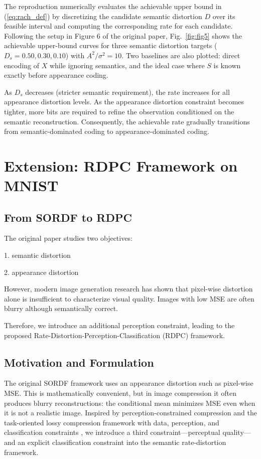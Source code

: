 \documentclass[conference]{IEEEtran}
\begin{document}
The reproduction numerically evaluates the achievable upper bound in (\ref{eq:rach_def}) by discretizing the candidate semantic distortion $D$ over its feasible interval and computing the corresponding rate for each candidate. Following the setup in Figure 6 of the original paper, Fig.~\ref{fig:fig5} shows the achievable upper-bound curves for three semantic distortion targets ($D_s = 0.50, 0.30, 0.10$) with $A^2/\sigma^2 = 10$. Two baselines are also plotted: direct encoding of $X$ while ignoring semantics, and the ideal case where $S$ is known exactly before appearance coding.

As $D_s$ decreases (stricter semantic requirement), the rate increases for all appearance distortion levels. As the appearance distortion constraint becomes tighter, more bits are required to refine the observation conditioned on the semantic reconstruction. Consequently, the achievable rate gradually transitions from semantic-dominated coding to appearance-dominated coding.

\section{Extension: RDPC Framework on MNIST}

\subsection{From SORDF to RDPC}

The original paper studies two objectives:

1. semantic distortion

2. appearance distortion

However, modern image generation research has shown that
pixel-wise distortion alone is insufficient to characterize
visual quality.
Images with low MSE are often blurry although semantically
correct.

Therefore,
we introduce an additional perception constraint,
leading to the proposed
Rate-Distortion-Perception-Classification (RDPC) framework.

\subsection{Motivation and Formulation}

The original SORDF framework uses an appearance distortion such as pixel-wise MSE. This is mathematically convenient, but in image compression it often produces blurry reconstructions: the conditional mean minimizes MSE even when it is not a realistic image. Inspired by perception-constrained compression \cite{blau2019rethinking} and the task-oriented lossy compression framework with data, perception, and classification constraints \cite{wang2024task}, we introduce a third constraint---perceptual quality---and an explicit classification constraint into the semantic rate-distortion framework.
\end{document}
